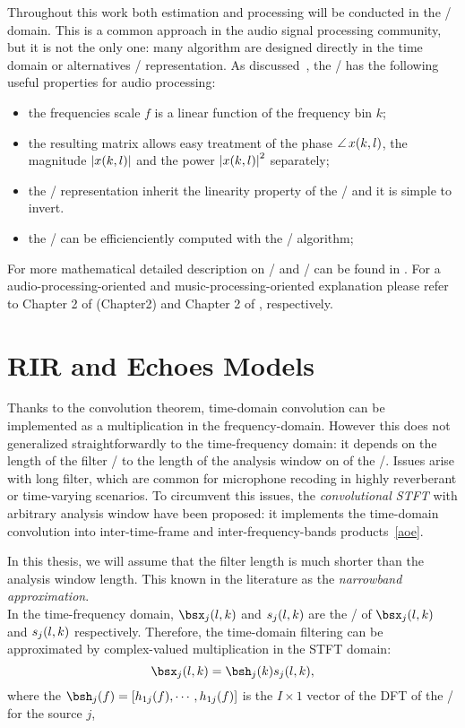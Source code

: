 Throughout this work both estimation and processing will be conducted in the \STFT/ domain.
This is a common approach in the audio signal processing community, but it is not the only one:
many algorithm are designed directly in the time domain or alternatives \TF/ representation.
As discussed~\cite{vincent2018audio}, the \STFT/ has the following useful properties for audio processing:
\begin{itemize}
    \item the frequencies scale $f$ is a linear function of the frequency bin $k$;
    \item the resulting matrix allows easy treatment of the phase $\operatorname*{\angle}{x(k,l)}$, the magnitude $\magnitudeOf{x(k,l)}$ and the power $\powerOf{x(k,l)}$ separately;
    \item the \STFT/ representation inherit the linearity property of the \DFT/ and it is simple to invert.
    \item the \DFT/ can be efficienciently computed with the \FFT/ algorithm;
\end{itemize}
For more mathematical detailed description on \DFT/ and \STFT/ can be found in .
For a audio-processing-oriented and music-processing-oriented explanation please refer to Chapter 2 of  (Chapter2) and Chapter 2 of , respectively.

\section{RIR and Echoes Models}
Thanks to the convolution theorem, time-domain convolution can be implemented as a multiplication in the frequency-domain.
However this does not generalized straightforwardly to the time-frequency domain:
it depends on the length of the filter \wrt/ to the length of the analysis window on of the \STFT/.
Issues arise with long filter, which are common for microphone recoding in highly reverberant or time-varying scenarios.
To circumvent this issues, the \textit{convolutional STFT} with arbitrary analysis window have been proposed:
it implements the time-domain convolution into inter-time-frame and inter-frequency-bands products~\cref{aoe}.

In this thesis, we will assume that the filter length is much shorter than the analysis window length.
This known in the literature as the \textit{narrowband approximation}\cite{}.
\\In the time-frequency domain, $\mics_j(l,k)$  and $s_j(l,k)$ are the \STFT/ of $\mics_j(l,k)$ and $s_j(l,k)$ respectively.
Therefore, the time-domain filtering can be approximated by complex-valued multiplication in the STFT domain:
\begin{equation}
    \mics_j(l,k) = \bsh_j(k) \src_j(l,k)
    ,
\end{equation}
where the $\bsh_j(f) = \klist{h_{1j}(f), \cdots, h_{1j}(f)}$ is the $I \times 1$ vector of the DFT of the
\RIRs/ for the source $j$,

